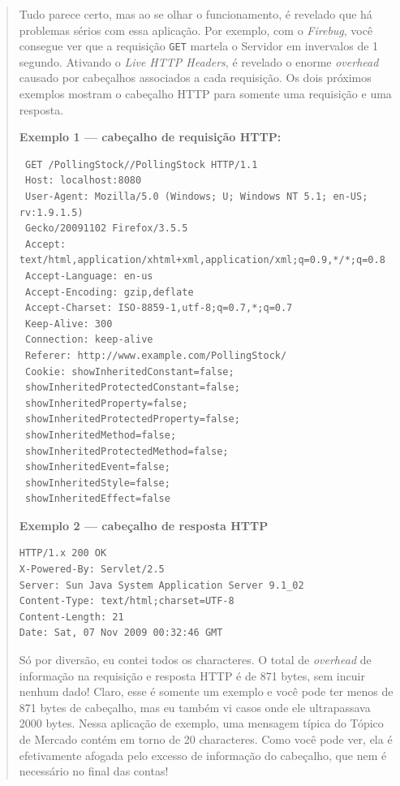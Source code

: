 \documentclass[a4paper,12pt]{article}
\newcommand{\code}[1]{\lstinline[mathescape=true, columns=fixed, basicstyle={\small\ttfamily}]{#1}}
\begin{document}
\begin{quotation}
Tudo parece certo, mas ao se olhar o funcionamento, é revelado que há problemas sérios com essa aplicação. Por exemplo, com o \emph{Firebug}, você consegue ver que a requisição \code{GET} martela o Servidor em invervalos de 1 segundo. Ativando o \emph{Live HTTP Headers}, é revelado o enorme \emph{overhead} causado por cabeçalhos associados a cada requisição. Os dois próximos exemplos mostram o cabeçalho HTTP para somente uma requisição e uma resposta.

\textbf{Exemplo 1 — cabeçalho de requisição HTTP:}
\begin{lstlisting}
 GET /PollingStock//PollingStock HTTP/1.1
 Host: localhost:8080
 User-Agent: Mozilla/5.0 (Windows; U; Windows NT 5.1; en-US; rv:1.9.1.5)
 Gecko/20091102 Firefox/3.5.5
 Accept: text/html,application/xhtml+xml,application/xml;q=0.9,*/*;q=0.8
 Accept-Language: en-us
 Accept-Encoding: gzip,deflate
 Accept-Charset: ISO-8859-1,utf-8;q=0.7,*;q=0.7
 Keep-Alive: 300
 Connection: keep-alive
 Referer: http://www.example.com/PollingStock/
 Cookie: showInheritedConstant=false;
 showInheritedProtectedConstant=false;
 showInheritedProperty=false;
 showInheritedProtectedProperty=false;
 showInheritedMethod=false;
 showInheritedProtectedMethod=false;
 showInheritedEvent=false;
 showInheritedStyle=false;
 showInheritedEffect=false
\end{lstlisting}

\textbf{Exemplo 2 — cabeçalho de resposta HTTP}
\begin{lstlisting}
HTTP/1.x 200 OK
X-Powered-By: Servlet/2.5
Server: Sun Java System Application Server 9.1_02
Content-Type: text/html;charset=UTF-8
Content-Length: 21
Date: Sat, 07 Nov 2009 00:32:46 GMT
\end{lstlisting}

Só por diversão, eu contei todos os characteres. O total de \emph{overhead} de informação na requisição e resposta HTTP é de 871 bytes, sem incuir nenhum dado! Claro, esse é somente um exemplo e você pode ter menos de 871 bytes de cabeçalho, mas eu também vi casos onde ele ultrapassava 2000 bytes. Nessa aplicação de exemplo, uma mensagem típica do Tópico de Mercado contém em torno de 20 characteres. Como você pode ver, ela é efetivamente afogada pelo excesso de informação do cabeçalho, que nem é necessário no final das contas!


\end{quotation}
\end{document}
